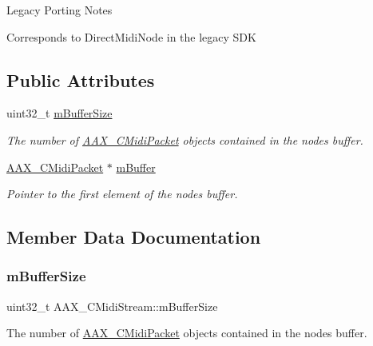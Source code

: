 \begin{DoxyRefDesc}{Legacy Porting Notes}
\item[\mbox{\hyperlink{a00787__porting_notes000004}{Legacy Porting Notes}}]Corresponds to Direct\+Midi\+Node in the legacy S\+DK \end{DoxyRefDesc}
\subsection*{Public Attributes}
\begin{DoxyCompactItemize}
\item 
uint32\+\_\+t \mbox{\hyperlink{a01433_ad93c962a8278977f2a4f07b1e7490a90}{m\+Buffer\+Size}}
\begin{DoxyCompactList}\small\item\em The number of \mbox{\hyperlink{a01429}{A\+A\+X\+\_\+\+C\+Midi\+Packet}} objects contained in the node\textquotesingle{}s buffer. \end{DoxyCompactList}\item 
\mbox{\hyperlink{a01429}{A\+A\+X\+\_\+\+C\+Midi\+Packet}} $\ast$ \mbox{\hyperlink{a01433_a5011ea886dce57b382c23b82e56d3000}{m\+Buffer}}
\begin{DoxyCompactList}\small\item\em Pointer to the first element of the node\textquotesingle{}s buffer. \end{DoxyCompactList}\end{DoxyCompactItemize}


\subsection{Member Data Documentation}
\mbox{\label{a01433_ad93c962a8278977f2a4f07b1e7490a90}} 
\subsubsection{\texorpdfstring{mBufferSize}{mBufferSize}}
{\footnotesize\ttfamily uint32\+\_\+t A\+A\+X\+\_\+\+C\+Midi\+Stream\+::m\+Buffer\+Size}



The number of \mbox{\hyperlink{a01429}{A\+A\+X\+\_\+\+C\+Midi\+Packet}} objects contained in the node\textquotesingle{}s buffer. 

\mbox{\label{a01433_a5011ea886dce57b382c23b82e56d3000}} 
